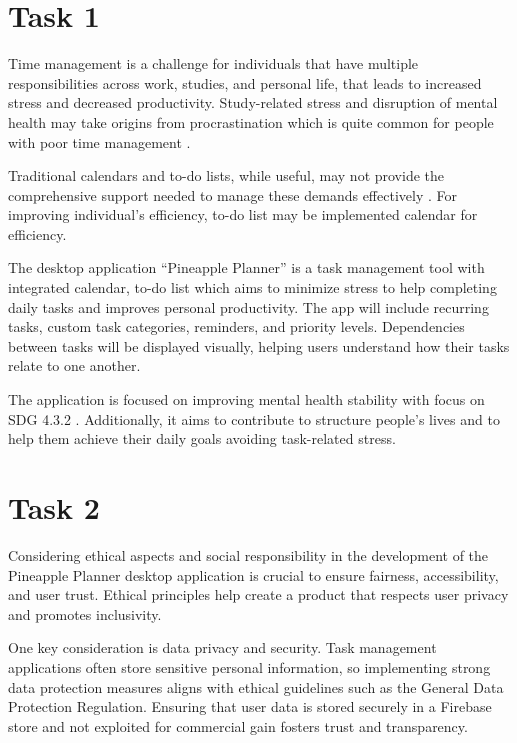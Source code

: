 \documentclass{article}
\begin{document}
\newpage

\section{Task 1}

Time management is a challenge for individuals that have multiple responsibilities across work, studies, and personal life, that leads to increased stress and decreased productivity.
Study-related stress and disruption of mental health may take origins from procrastination which is quite common for people with poor time management \cite{ nayak2019impact}.

Traditional calendars and to-do lists, while useful, may not provide the comprehensive support needed to manage these demands effectively \cite{bek2014study}.
For improving individual’s efficiency, to-do list may be implemented calendar for efficiency.

The desktop application “Pineapple Planner” is a task management tool with integrated calendar, to-do list which aims to minimize stress to help completing daily tasks and improves personal productivity.
The app will include recurring tasks, custom task categories, reminders, and priority levels.
Dependencies between tasks will be displayed visually, helping users understand how their tasks relate to one another.

The application is focused on improving mental health stability with focus on SDG 4.3.2 \cite{worldhealthorganisation_2024_sdg}.
Additionally, it aims to contribute to structure people’s lives and to help them achieve their daily goals avoiding task-related stress.

\section{Task 2}
Considering ethical aspects and social responsibility in the development of the Pineapple Planner desktop application is crucial to ensure fairness, accessibility, and user trust.
Ethical principles help create a product that respects user privacy and promotes inclusivity.

One key consideration is data privacy and security.
Task management applications often store sensitive personal information, so implementing strong data protection measures aligns with ethical guidelines such as the General Data Protection Regulation.
Ensuring that user data is stored securely in a Firebase store and not exploited for commercial gain fosters trust and transparency.
\cite{hoofnagle2019european}
\end{document}
